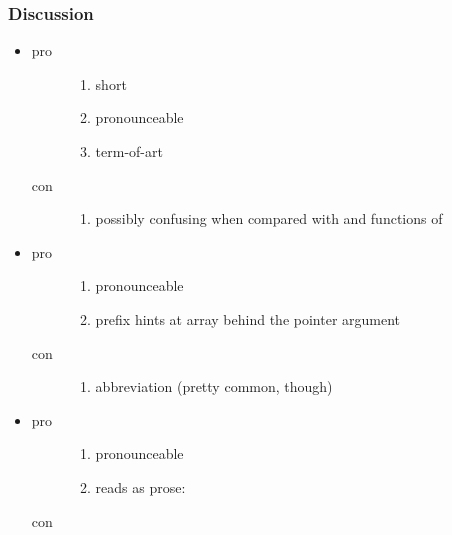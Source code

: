 \subsubsection{Discussion}
\begin{itemize}
  \item {}
    \begin{description}
      \item[pro]
        \begin{enumerate}
          \item short
          \item pronounceable
          \item term-of-art
        \end{enumerate}
      \item[con]
        \begin{enumerate}
          \item possibly confusing when compared with  and  functions of 
        \end{enumerate}
    \end{description}

  \item {}
    \begin{description}
      \item[pro]
        \begin{enumerate}
          \item pronounceable
          \item {} prefix hints at array behind the pointer argument
        \end{enumerate}
      \item[con]
        \begin{enumerate}
          \item abbreviation (pretty common, though)
        \end{enumerate}
    \end{description}

  \item {}
    \begin{description}
      \item[pro]
        \begin{enumerate}
          \item pronounceable
          \item reads as prose: 
        \end{enumerate}
      \item[con]
        \begin{enumerate}
        \end{enumerate}
    \end{description}


\end{itemize}
